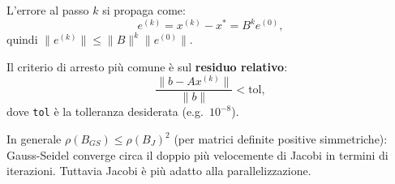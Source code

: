 L'errore al passo $k$ si propaga come:
\begin{equation}
  e^{(k)} = x^{(k)} - x^* = B^k e^{(0)},
\end{equation}
quindi $\|e^{(k)}\| \leq \|B\|^k \|e^{(0)}\|$.

Il criterio di arresto più comune è sul \textbf{residuo relativo}:
\begin{equation}
  \frac{\|b - Ax^{(k)}\|}{\|b\|} < \text{tol},
  \label{eq:stop}
\end{equation}
dove \texttt{tol} è la tolleranza desiderata (e.g.\ $10^{-8}$).

\begin{remark}
In generale $\rho(B_{GS}) \leq \rho(B_J)^2$ (per matrici definite positive
simmetriche): Gauss-Seidel converge circa il doppio più velocemente di Jacobi in
termini di iterazioni. Tuttavia Jacobi è più adatto alla parallelizzazione.
\end{remark}
